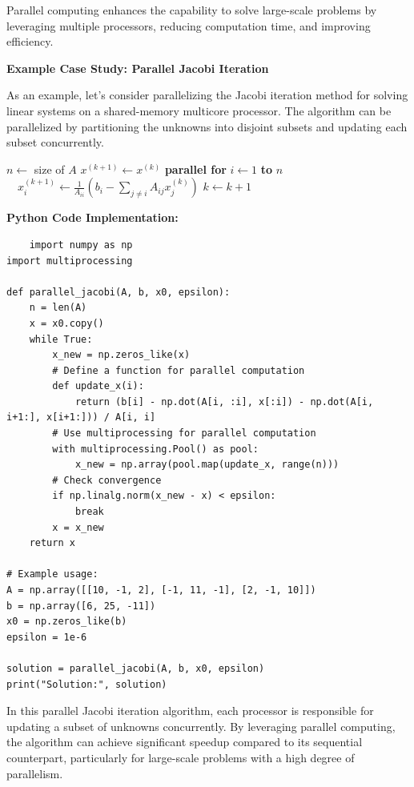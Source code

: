 \documentclass[12pt]{book} %
\begin{document}
Parallel computing enhances the capability to solve large-scale problems by leveraging multiple processors, reducing computation time, and improving efficiency.

\textbf{Example Case Study: Parallel Jacobi Iteration}

As an example, let's consider parallelizing the Jacobi iteration method for solving linear systems on a shared-memory multicore processor. The algorithm can be parallelized by partitioning the unknowns into disjoint subsets and updating each subset concurrently.
\FloatBarrier
\begin{algorithm}[H]
\caption{Parallel Jacobi Iteration}
\begin{algorithmic}[1]
    \State $n \gets$ size of $A$
        \State $x^{(k+1)} \gets x^{(k)}$
        \State \textbf{parallel for} $i \gets 1$ \textbf{to} $n$
            \State $\quad x_i^{(k+1)} \gets \frac{1}{A_{ii}} \left( b_i - \sum_{j \neq i} A_{ij} x_j^{(k)} \right)$
        \State $k \gets k + 1$
    \EndWhile
\EndProcedure
\end{algorithmic}
\end{algorithm}
\FloatBarrier

\textbf{Python Code Implementation:}
\FloatBarrier
\begin{lstlisting}
    import numpy as np
import multiprocessing

def parallel_jacobi(A, b, x0, epsilon):
    n = len(A)
    x = x0.copy()
    while True:
        x_new = np.zeros_like(x)
        # Define a function for parallel computation
        def update_x(i):
            return (b[i] - np.dot(A[i, :i], x[:i]) - np.dot(A[i, i+1:], x[i+1:])) / A[i, i]
        # Use multiprocessing for parallel computation
        with multiprocessing.Pool() as pool:
            x_new = np.array(pool.map(update_x, range(n)))
        # Check convergence
        if np.linalg.norm(x_new - x) < epsilon:
            break
        x = x_new
    return x

# Example usage:
A = np.array([[10, -1, 2], [-1, 11, -1], [2, -1, 10]])
b = np.array([6, 25, -11])
x0 = np.zeros_like(b)
epsilon = 1e-6

solution = parallel_jacobi(A, b, x0, epsilon)
print("Solution:", solution)
\end{lstlisting}
\FloatBarrier

In this parallel Jacobi iteration algorithm, each processor is responsible for updating a subset of unknowns concurrently. By leveraging parallel computing, the algorithm can achieve significant speedup compared to its sequential counterpart, particularly for large-scale problems with a high degree of parallelism.
\end{document}
